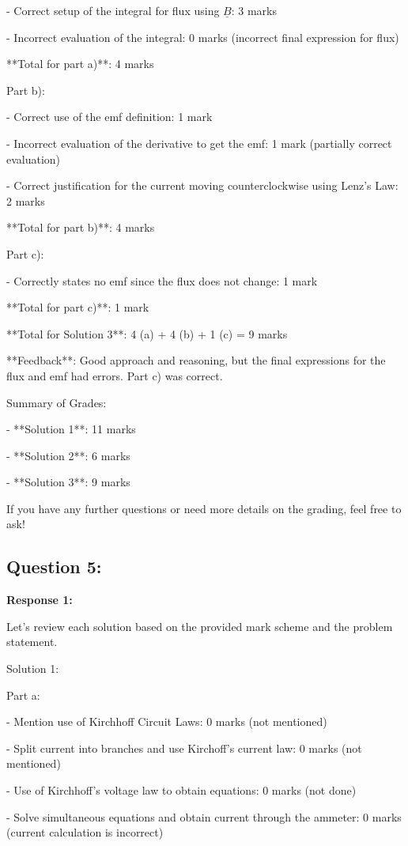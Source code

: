 \documentclass[a4paper,11pt]{article}
\begin{document}
- Correct setup of the integral for flux using \( \underline{B} \): 3 marks

- Incorrect evaluation of the integral: 0 marks (incorrect final expression for flux)

**Total for part a)**: 4 marks

Part b):

- Correct use of the emf definition: 1 mark

- Incorrect evaluation of the derivative to get the emf: 1 mark (partially correct evaluation)

- Correct justification for the current moving counterclockwise using Lenz's Law: 2 marks

**Total for part b)**: 4 marks

Part c):

- Correctly states no emf since the flux does not change: 1 mark

**Total for part c)**: 1 mark

**Total for Solution 3**: 4 (a) + 4 (b) + 1 (c) = 9 marks

**Feedback**: Good approach and reasoning, but the final expressions for the flux and emf had errors. Part c) was correct.

Summary of Grades:

- **Solution 1**: 11 marks

- **Solution 2**: 6 marks

- **Solution 3**: 9 marks

If you have any further questions or need more details on the grading, feel free to ask!


\subsection*{Question 5:}

\textbf{Response 1:}

Let's review each solution based on the provided mark scheme and the problem statement.

Solution 1:

Part a:

- Mention use of Kirchhoff Circuit Laws: 0 marks (not mentioned)

- Split current into branches and use Kirchoff’s current law: 0 marks (not mentioned)

- Use of Kirchhoff’s voltage law to obtain equations: 0 marks (not done)

- Solve simultaneous equations and obtain current through the ammeter: 0 marks (current calculation is incorrect)
\end{document}

